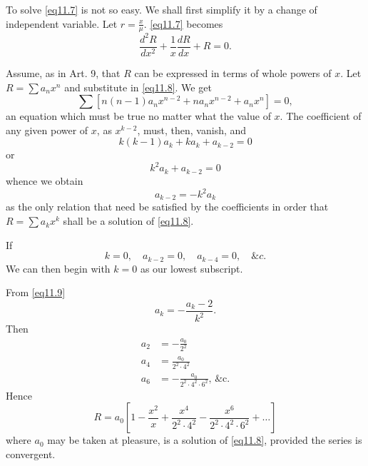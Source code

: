 \documentclass[oneside,12pt]{book}
\begin{document}
To solve \eqref{eq11.7} is not so easy. We shall first simplify it by a change of independent variable. Let $r=\frac{x}{\mu}$. \eqref{eq11.7} becomes 
\begin{equation}
    \frac{d^2R}{dx^2}+\frac{1}{x}\frac{dR}{dx}+R=0. \label{eq11.8}
\end{equation} \par 

Assume, as in Art. 9, that $R$ can be expressed in terms of whole powers of $x$. Let $R=\sum a_nx^n$ and substitute in \eqref{eq11.8}. We get 
\begin{equation*}
    \sum[n(n-1)a_nx^{n-2}+na_nx^{n-2}+a_nx^n]=0,
\end{equation*}
an equation which must be true no matter what the value of $x$. The coefficient of any given power of $x$, as $x^{k-2}$, must, then, vanish, and 
$$k(k-1)a_k+ka_k+a_{k-2}=0$$ 
or $$k^2a_k+a_{k-2}=0$$  
whence we obtain 
\begin{equation}
    a_{k-2}=-k^2a_k  \label{eq11.9}
\end{equation}
as the only relation that need be satisfied by the coefficients in order that $R=\sum a_kx^k$ shall be a solution of \eqref{eq11.8}. \par 

If 
$$ k=0,\quad a_{k-2}=0,\quad a_{k-4}=0,\quad \& c.$$ 
We can then begin with $k=0$ as our lowest subscript. \par 

From \eqref{eq11.9} 
$$a_k=-\frac{a_k-2}{k^2}.$$
Then 
\begin{align*}
    a_2&=-\frac{a_0}{2^2} \\
    a_4&=\frac{a_0}{2^2\cdot4^2} \\
    a_6&=-\frac{a_0}{2^2\cdot4^2\cdot6^2},\, \text{\& c.}
\end{align*}
Hence 
$$R=a_0\left[1-\frac{x^2}{x}+\frac{x^4}{2^2\cdot4^2}-\frac{x^6}{2^2\cdot4^2\cdot6^2}+\dots\right]$$
where $a_0$ may be taken at pleasure, is a solution of \eqref{eq11.8}, provided the series is convergent. \par 
\end{document}
